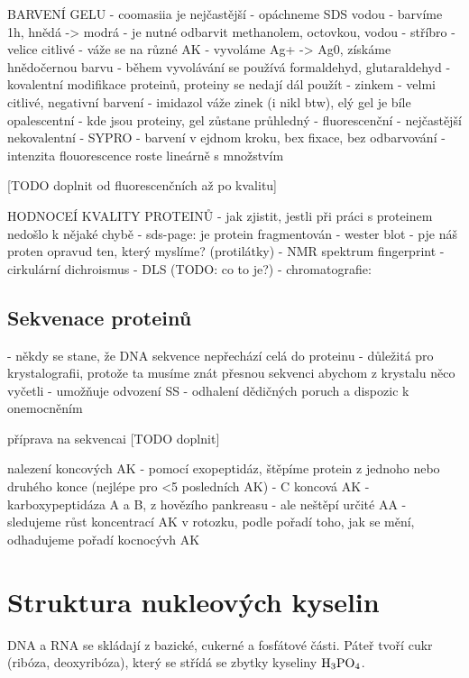 \documentclass[DIV=8]{scrreprt}
\begin{document}
BARVENÍ GELU
- coomasiia je nejčastější
    - opáchneme SDS vodou
    - barvíme 1h, hnědá -> modrá
    - je nutné odbarvit methanolem, octovkou, vodou
- stříbro
    - velice citlivé
    - váže se na různé AK
    - vyvoláme Ag+ -> Ag0, získáme hnědočernou barvu
    - během vyvolávání se používá formaldehyd, glutaraldehyd
        - kovalentní modifikace proteinů, proteiny se nedají dál použít
- zinkem
    - velmi citlivé, negativní barvení
    - imidazol váže zinek (i nikl btw), elý gel je bíle opalescentní
    - kde jsou proteiny, gel zůstane průhledný
- fluorescenční
    - nejčastější nekovalentní
    - SYPRO
        - barvení v ejdnom kroku, bex fixace, bez odbarvování
        - intenzita flouorescence roste lineárně s množstvím

[TODO doplnit od fluorescenčních až po kvalitu]

HODNOCEÍ KVALITY PROTEINŮ
- jak zjistit, jestli při práci s proteinem nedošlo k nějaké chybě
- sds-page: je protein fragmentován
- wester blot - pje náš proten opravud ten, který myslíme? (protilátky)
- NMR spektrum fingerprint
- cirkulární dichroismus
- DLS (TODO: co to je?)
- chromatografie:

\section{Sekvenace proteinů} \label{Sekvenace proteinů} \FloatBarrier

- někdy se stane, že DNA sekvence nepřechází celá do proteinu
- důležitá pro krystalografii, protože ta musíme znát přesnou sekvenci abychom z krystalu něco vyčetli
- umožňuje odvození SS
- odhalení dědičných poruch a dispozic k onemocněním


příprava na sekvencai
[TODO doplnit]

nalezení koncových AK
- pomocí exopeptidáz, štěpíme protein z jednoho nebo druhého konce (nejlépe pro <5 posledních AK)
- C koncová AK
    - karboxypeptidáza A a B, z hovězího pankreasu
    - ale neštěpí určité AA
- sledujeme růst koncentrací AK v rotozku, podle pořadí toho, jak se mění, odhadujeme pořadí kocnocývh AK


\chapter{Struktura nukleových kyselin} \label{Struktura nukleových kyselin}


DNA a RNA se skládají z bazické, cukerné a fosfátové části. Páteř tvoří cukr (ribóza, deoxyribóza), který se střídá se zbytky kyseliny \(\ce{H3PO4}\).
\end{document}
